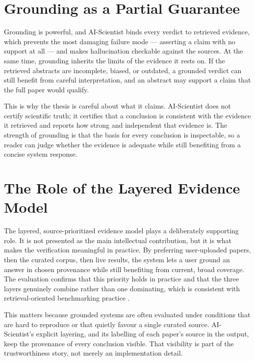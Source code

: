 \section{Grounding as a Partial Guarantee }

Grounding is powerful, and AI-Scientist binds every verdict to retrieved evidence, which prevents the most
damaging failure mode --- asserting a claim with no support at all --- and makes hallucination checkable against
the sources. At the same time, grounding inherits the limits of the evidence it rests on. If the retrieved
abstracts are incomplete, biased, or outdated, a grounded verdict can still benefit from careful interpretation,
and an abstract may support a claim that the full paper would qualify.

This is why the thesis is careful about what it claims. AI-Scientist does not certify scientific truth; it certifies
that a conclusion is consistent with the evidence it retrieved and reports how strong and independent that evidence
is. The strength of grounding is that the basis for every conclusion is inspectable, so a reader can judge whether
the evidence is adequate while still benefiting from a concise system response.

\section{The Role of the Layered Evidence Model }

The layered, source-prioritized evidence model plays a deliberately supporting role. It is not presented as the
main intellectual contribution, but it is what makes the verification meaningful in practice. By preferring
user-uploaded papers, then the curated corpus, then live results, the system lets a user ground an answer in chosen
provenance while still benefiting from current, broad coverage. The evaluation confirms that this priority holds in
practice and that the three layers genuinely combine rather than one dominating, which is consistent with
retrieval-oriented benchmarking practice \cite{petroni2020kilt,thakur2021beir,ragsurvey2024}.

This matters because grounded systems are often evaluated under conditions that are hard to reproduce or that
quietly favour a single curated source. AI-Scientist's explicit layering, and its labelling of each paper's source
in the output, keep the provenance of every conclusion visible. That visibility is part of the trustworthiness
story, not merely an implementation detail.

